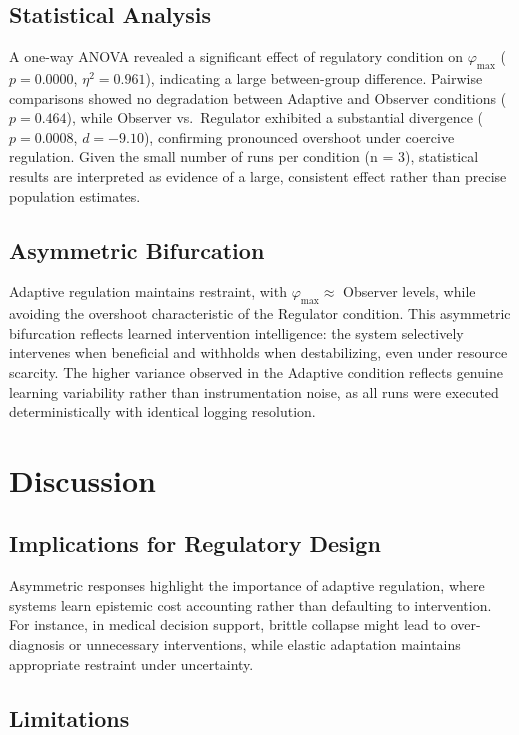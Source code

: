 \documentclass[12pt,a4paper]{article}
\theoremstyle{plain}
\theoremstyle{definition}
\theoremstyle{remark}
\begin{document}
\subsection{Statistical Analysis}

A one-way ANOVA revealed a significant effect of regulatory condition on 
$\varphi_{\max}$ ($p = 0.0000$, $\eta^{2} = 0.961$), indicating a large 
between-group difference. Pairwise comparisons showed no degradation between 
Adaptive and Observer conditions ($p = 0.464$), while Observer vs.\ Regulator 
exhibited a substantial divergence ($p = 0.0008$, $d = -9.10$), confirming 
pronounced overshoot under coercive regulation.
Given the small number of runs per condition (n = 3), statistical results are interpreted as evidence of a large, consistent effect rather than precise population estimates.

\subsection{Asymmetric Bifurcation}

Adaptive regulation maintains restraint, with 
$\varphi_{\max} \approx$ Observer levels, while avoiding the overshoot 
characteristic of the Regulator condition. This asymmetric bifurcation reflects 
learned intervention intelligence: the system selectively intervenes when 
beneficial and withholds when destabilizing, even under resource scarcity.
The higher variance observed in the Adaptive condition reflects genuine learning variability rather than instrumentation noise, as all runs were executed deterministically with identical logging resolution.


\section{Discussion}

\subsection{Implications for Regulatory Design}

Asymmetric responses highlight the importance of adaptive regulation, where systems learn epistemic cost accounting rather than defaulting to intervention. For instance, in medical decision support, brittle collapse might lead to over-diagnosis or unnecessary interventions, while elastic adaptation maintains appropriate restraint under uncertainty.

\subsection{Limitations}
\end{document}

